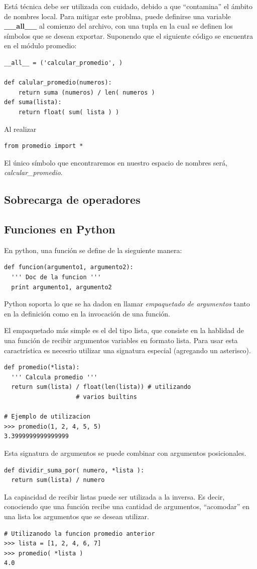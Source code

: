 \documentclass[a4paper]{report}
\begin{document}
Está técnica debe ser utilizada con cuidado, debido a que ``contamina'' el
ámbito de nombres local. Para
mitigar este problma, puede definirse una variable \textbf{\_\_all\_\_} al
comienzo del archivo, con una tupla
en la cual se definen los símbolos que se desean exportar. Suponendo que el
siguiente código se encuentra
en el módulo promedio:

\begin{lstlisting}[style=python]
__all__ = ('calcular_promedio', )

def calular_promedio(numeros):
    return suma (numeros) / len( numeros )
def suma(lista):
    return float( sum( lista ) ) 
\end{lstlisting}

Al realizar
\begin{lstlisting}[style=python]
 from promedio import *
\end{lstlisting}

El único símbolo que encontraremos en nuestro espacio de nombres será,
\emph{calcular\_promedio}.
\subsection{Sobrecarga de operadores}

\subsection{Funciones en Python}
En python, una función se define de la sieguiente manera:
\begin{lstlisting}[style=python]
def funcion(argumento1, argumento2):
  ''' Doc de la funcion '''
  print argumento1, argumento2
\end{lstlisting}
Python soporta lo que se ha dadon en llamar \emph{empaquetado de argumentos }
tanto en la 
definición como en la invocación de una función.

El empaquetado más simple es el del tipo lista, que consiste en la hablidad de
una función de
recibir argumentos variables en formato lista. Para usar esta caractrística es
necesrio utilizar
una signatura especial (agregando un asterisco).

\begin{lstlisting}[style=python]
def promedio(*lista):
  ''' Calcula promedio '''
  return sum(lista) / float(len(lista)) # utilizando 
					# varios builtins

# Ejemplo de utilizacion
>>> promedio(1, 2, 4, 5, 5)
3.3999999999999999

\end{lstlisting}
Esta signatura de argumentos se puede combinar con argumentos posicionales.
\begin{lstlisting}[style=python]
def dividir_suma_por( numero, *lista ):
  return sum(lista) / numero
\end{lstlisting}
La capiacidad de recibir listas puede ser utilizada a la inversa. Es decir,
conociendo que una función
recibe una cantidad de argumentos, ``acomodar'' en una lista los argumentos que
se desean utilizar.
\begin{lstlisting}[style=python]
# Utilizanodo la funcion promedio anterior
>>> lista = [1, 2, 4, 6, 7]
>>> promedio( *lista )
4.0
\end{lstlisting}
\end{document}
